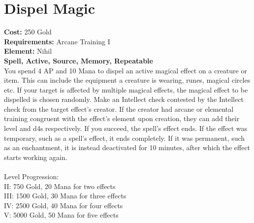 \section{Dispel Magic}
\textbf{Cost:} 250 Gold\\
\textbf{Requirements:} Arcane Training I\\
\textbf{Element:} Nihil\\
\textbf{Spell, Active, Source, Memory, Repeatable}\\
You spend 4 AP and 10 Mana to dispel an active magical effect on a creature or item. This can include the equipment a creature is wearing, runes, magical circles etc. If your target is affected by multiple magical effects, the magical effect to be dispelled is chosen randomly. Make an Intellect check contested by the Intellect check from the target effect's creator. If the creator had arcane or elemental training congruent with the effect's element upon creation, they can add their level and d4s respectively. If you succeed, the spell's effect ends. If the effect was temporary, such as a spell's effect, it ends completely. If it was permanent, such as an enchantment, it is instead deactivated for 10 minutes, after which the effect starts working again.\\
\\
Level Progression:\\
II: 750 Gold, 20 Mana for two effects\\
III: 1500 Gold, 30 Mana for three effects\\
IV: 2500 Gold, 40 Mana for four effects\\
V: 5000 Gold, 50 Mana for five effects\\